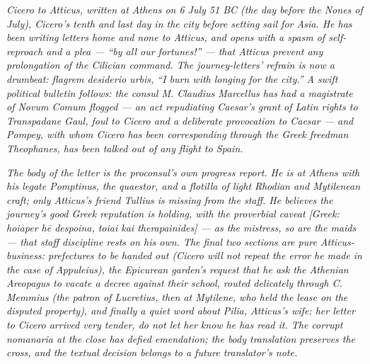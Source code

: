 
\textit{Cicero to Atticus, written at Athens on 6 July 51 BC
(the day before the Nones of July), Cicero's tenth and last
day in the city before setting sail for Asia. He has been
writing letters home and none to Atticus, and opens with a
spasm of self-reproach and a plea --- ``by all our
fortunes!'' --- that Atticus prevent any prolongation of the
Cilician command. The journey-letters' refrain is now a
drumbeat: \textit{flagrem desiderio urbis}, ``I burn with
longing for the city.'' A swift political bulletin follows:
the consul M. Claudius Marcellus has had a magistrate of
Novum Comum flogged --- an act repudiating Caesar's grant of
Latin rights to Transpadane Gaul, foul to Cicero and a
deliberate provocation to Caesar --- and Pompey, with whom
Cicero has been corresponding through the Greek freedman
Theophanes, has been talked out of any flight to Spain.}

\textit{The body of the letter is the proconsul's own progress
report. He is at Athens with his legate Pomptinus, the
quaestor, and a flotilla of light Rhodian and Mytilenean
craft; only Atticus's friend Tullius is missing from the
staff. He believes the journey's good Greek reputation is
holding, with the proverbial caveat \textit{[Greek: hoiaper
hē despoina, toiai kai therapainides]} --- as the mistress,
so are the maids --- that staff discipline rests on his own.
The final two sections are pure Atticus-business: prefectures
to be handed out (Cicero will not repeat the error he made
in the case of Appuleius), the Epicurean garden's request
that he ask the Athenian Areopagus to vacate a decree against
their school, routed delicately through C. Memmius (the
patron of Lucretius, then at Mytilene, who held the lease on
the disputed property), and finally a quiet word about Pilia,
Atticus's wife: her letter to Cicero arrived very tender, do
not let her know he has read it. The corrupt
\textit{\textdagger{}nomanaria\textdagger{}} at the close has
defied emendation; the body translation preserves the cross,
and the textual decision belongs to a future translator's
note.}
